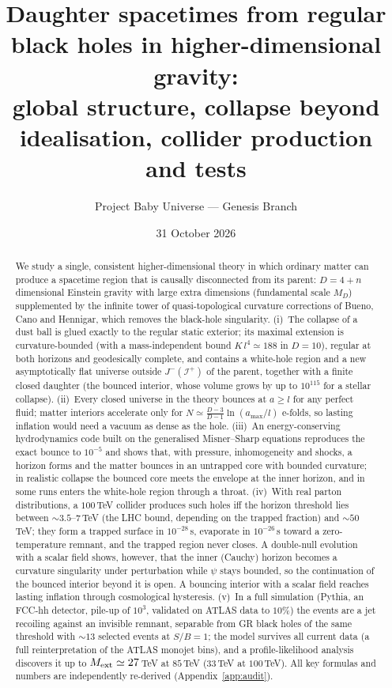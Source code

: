 \documentclass[11pt,a4paper]{article}
\title{Daughter spacetimes from regular black holes in higher-dimensional gravity:\\
global structure, collapse beyond idealisation, collider production and tests}
\author{Project Baby Universe --- Genesis Branch}
\date{31 October 2026}
\theoremstyle{remark}\newtheorem{remark}[theorem]{Remark}
\begin{document}
\maketitle

\begin{abstract}
We study a single, consistent higher-dimensional theory in which ordinary matter can produce a spacetime region that is causally
disconnected from its parent: $D=4+n$ dimensional Einstein gravity with large extra dimensions (fundamental scale $M_D$) supplemented by
the infinite tower of quasi-topological curvature corrections of Bueno, Cano and Hennigar, which removes the black-hole singularity.
(i)~The collapse of a dust ball is glued exactly to the regular static exterior; its maximal extension is curvature-bounded (with a
mass-independent bound $K\,l^4\simeq 188$ in $D=10$), regular at both horizons and geodesically complete, and contains a white-hole region
and a new asymptotically flat universe outside $J^-(\mathcal I^+)$ of the parent, together with a finite closed daughter (the bounced
interior, whose volume grows by up to $10^{115}$ for a stellar collapse).
(ii)~Every closed universe in the theory bounces at $a\geq l$ for any perfect fluid; matter interiors accelerate only for
$N\simeq\frac{D-3}{D-1}\ln(a_{\max}/l)$ e-folds, so lasting inflation would need a vacuum as dense as the hole.
(iii)~An energy-conserving hydrodynamics code built on the generalised Misner--Sharp equations reproduces the exact bounce to $10^{-5}$ and
shows that, with pressure, inhomogeneity and shocks, a horizon forms and the matter bounces in an untrapped core with bounded curvature; in
realistic collapse the bounced core meets the envelope at the inner horizon, and in some runs enters the white-hole region through a throat.
(iv)~With real parton distributions, a $100$\,TeV collider produces such holes iff the horizon threshold lies between $\sim3.5$--$7$\,TeV
(the LHC bound, depending on the trapped fraction) and $\sim50$\,TeV; they form a trapped surface in $10^{-28}$\,s, evaporate in $10^{-26}$\,s
toward a zero-temperature remnant, and the trapped region never closes. A double-null evolution with a scalar field shows, however, that
the inner (Cauchy) horizon becomes a curvature singularity under perturbation while $\psi$ stays bounded, so the continuation of the
bounced interior beyond it is open. A bouncing interior with a scalar field reaches lasting inflation through cosmological hysteresis.
(v)~In a full simulation (Pythia, an FCC-hh detector, pile-up of $10^3$, validated on ATLAS data to $10\%$) the events are a jet
recoiling against an invisible remnant, separable from GR black holes of the same threshold with $\sim13$ selected events at $S/B=1$; the
model survives all current data (a full reinterpretation of the ATLAS monojet bins), and a profile-likelihood analysis discovers it up to
$M_{\rm ext}\simeq27$\,TeV at $85$\,TeV ($33$\,TeV at $100$\,TeV).
All key formulas and numbers are independently re-derived (Appendix~\ref{app:audit}).
\end{abstract}
\end{document}
